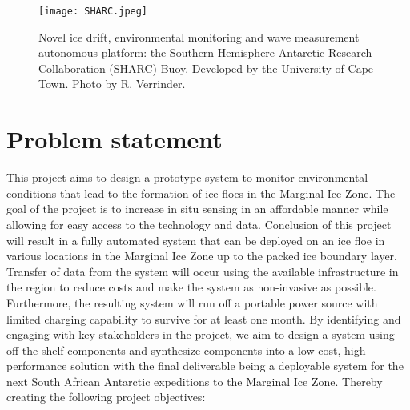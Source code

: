 \begin{figure}[H]
    \centering
    \texttt{[image: SHARC.jpeg]}
    \caption{Novel ice drift, environmental monitoring and wave measurement autonomous platform: the Southern Hemisphere Antarctic Research Collaboration (SHARC) Buoy. Developed by the University of Cape Town. Photo by R. Verrinder.}
    \label{fig:chapter1_sharc_buoy}
\end{figure}


\section{Problem statement}
\label{subsec:ch1.section2}

This project aims to design a prototype system to monitor environmental conditions that lead to the formation of ice floes in the Marginal Ice Zone. The goal of the project is to increase in situ sensing in an affordable manner while allowing for easy access to the technology and data.  Conclusion of this project will result in a fully automated system that can be deployed on an ice floe in various locations in the Marginal Ice Zone up to the packed ice boundary layer. Transfer of data from the system will occur using the available infrastructure in the region to reduce costs and make the system as non-invasive as possible. Furthermore, the resulting system will run off a portable power source with limited charging capability to survive for at least one month. By identifying and engaging with key stakeholders in the project, we aim to design a system using off-the-shelf components and synthesize components into a low-cost, high-performance solution with the final deliverable being a deployable system for the next South African Antarctic expeditions to the Marginal Ice Zone.  Thereby creating the following project objectives:
